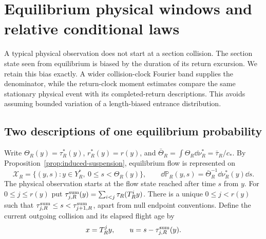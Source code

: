 \section{Equilibrium physical windows and relative conditional laws}
\label{sec:stationary-physical-conditioning}
A typical physical observation does not start at a section collision.
The section state seen from equilibrium is biased by the duration
of its return excursion. We retain this bias exactly. A wider
collision-clock Fourier band supplies the denominator, while the
return-clock moment estimates compare the same stationary physical
event with its completed-return descriptions. This avoids assuming
bounded variation of a length-biased entrance distribution.

\subsection{Two descriptions of one equilibrium probability}
Write $\Theta_R(y)=\tau_R^*(y)$, $r_R^*(y)=r(y)$, and
$\bar\Theta_R=\int\Theta_R\dd\nu_R^*=\bar\tau_R/c_*$. By
Proposition~\ref{prop:induced-suspension}, equilibrium flow is represented on
\begin{equation}\label{eq:stationary-return-suspension}
 \mathcal X_R=\{(y,s):y\in Y_R^*,\ 0\le s<\Theta_R(y)\},\qquad
 \dd\mathbb P_R(y,s)=\bar\Theta_R^{-1}\dd\nu_R^*(y)\dd s.
\end{equation}
The physical observation starts at the flow state reached after time
$s$ from $y$. For $0\le j\le r(y)$ put
$\tau_{j,R}^{\rm sum}(y)=\sum_{i<j}\tau_R(T_R^iy)$.
There is a unique $0\le j<r(y)$ such that
$\tau_{j,R}^{\rm sum}\le s<\tau_{j+1,R}^{\rm sum}$, apart from
null endpoint conventions. Define the current outgoing collision and
its elapsed flight age by
\[
 x=T_R^jy,\qquad u=s-\tau_{j,R}^{\rm sum}(y).
\]

